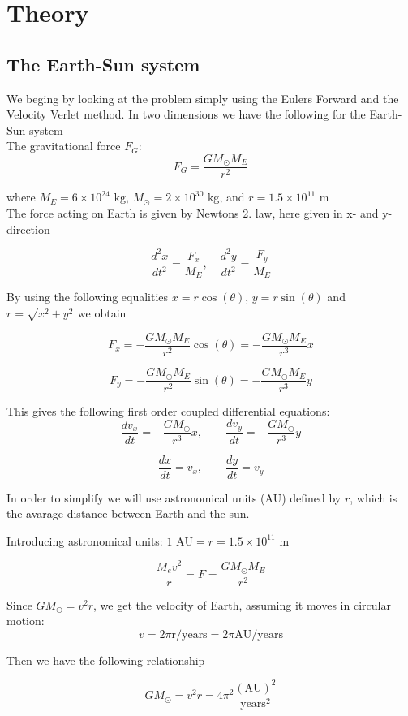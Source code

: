 \documentclass[../main.tex]{subfiles}
\begin{document}
\section{Theory}\label{theory}
\subsection{The Earth-Sun system}
We beging by looking at the problem simply using the Eulers Forward and the Velocity Verlet method.
In two dimensions we have the following for the Earth-Sun system \\

The gravitational force $F_G$:
$$F_G= \frac{GM_{\odot}M_E}{r^2}$$

where $M_E = 6\times 10^{24}\text{ kg}$,  $ M_{\odot} = 2\times 10^{30}\text{ kg}$, and  $r = 1.5\times 10^{11}\text{ m}$\\
The force acting on Earth is given by Newtons 2. law, here given in x- and y- direction

$$ \frac{d^2x}{dt^2} = \frac{F_x}{M_E}, \quad \frac{d^2y}{dt^2} = \frac{F_y}{M_E}$$

By using the following equalities $x = r \cos(\theta)$,  $y = r\sin(\theta)$ and $r = \sqrt{x^2 +y^2}$ we obtain

$$F_x = - \frac{GM_{\odot}M_E}{r^2} \cos(\theta) =- \frac{GM_{\odot}M_E}{r^3}x$$

$$F_y = - \frac{GM_{\odot}M_E}{r^2}\sin(\theta) =- \frac{GM_{\odot}M_E}{r^3}y$$


This gives the following first order  coupled differential equations:
$$ \frac{dv_x}{dt} = - \frac{GM_{\odot}}{r^3}x,\qquad \frac{dv_y}{dt} = - \frac{GM_{\odot}}{r^3}y$$

  $$\frac{dx}{dt} = v_x,\qquad \frac{dy}{dt} = v_y$$

In order to simplify we will use astronomical units (AU) defined by $r$, which is the avarage distance between Earth and the sun.

Introducing astronomical units: $1\text{ AU}= r = 1.5 \times 10^{11}\text{ m}$


$$ \frac{M_ev^2}{r} = F = \frac{GM_{\odot}M_E}{r^2}$$


Since $GM_{\odot} = v^2r$, we get the velocity of Earth, assuming it moves in circular motion: $$v = 2\pi \text{r/years}= 2\pi \text{AU/years}$$

Then we have the following relationship

$$GM_{\odot} = v^2r = 4\pi^2 \frac{(\text{AU})^2}{\text{years}^2}$$
\end{document}
